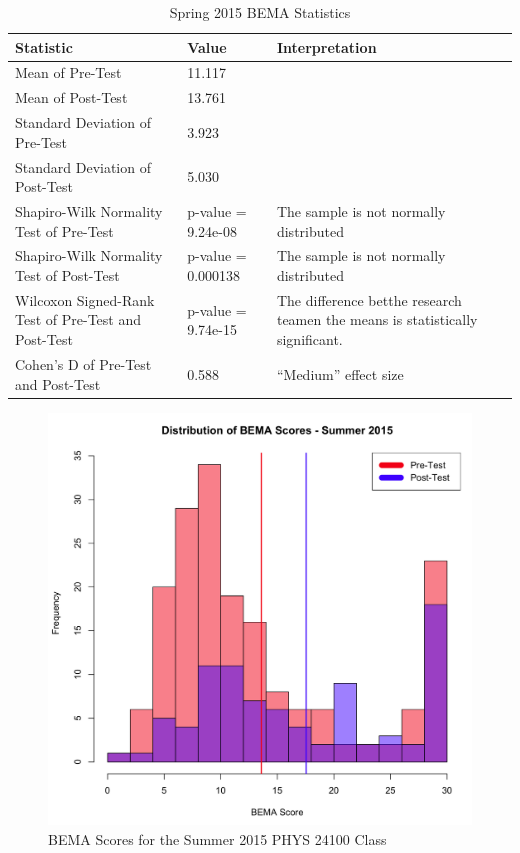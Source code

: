 \begin{landscape}
\begin{table}[!ht]
  \centering
  \begin{tabular}{|l|l|l|}
    \hline
    \textbf{Statistic} & \textbf{Value} & \textbf{Interpretation}\\
	\hline
	Mean of Pre-Test & 11.117 & \\
	\hline
	Mean of Post-Test & 13.761 & \\
	\hline
	Standard Deviation of Pre-Test & 3.923 & \\
	\hline
	Standard Deviation of Post-Test & 5.030 & \\
	\hline
	Shapiro-Wilk Normality Test of Pre-Test & p-value = 9.24e-08 & The sample is not normally distributed \\
	\hline
	Shapiro-Wilk Normality Test of Post-Test & p-value = 0.000138 & The sample is not normally distributed \\
	\hline
	Wilcoxon Signed-Rank Test of Pre-Test and Post-Test & p-value = 9.74e-15 & The difference betthe research teamen the means is statistically significant. \\
	\hline
	Cohen's D of Pre-Test and Post-Test & 0.588 & ``Medium'' effect size \\
	\hline
  \end{tabular}
  \caption{Spring 2015 BEMA Statistics}
  \label{tab:statsSp15}
\end{table}
\end{landscape}

\begin{figure}[!htb]
	\centering
	\includegraphics[width=6in]{img/chapter4/bema_summer_2015}
	\caption[BEMA Scores for the Summer 2015 PHYS 24100 Class]{BEMA Scores for the Summer 2015 PHYS 24100 Class}
  \label{fig:bemaSu15}
\end{figure}

